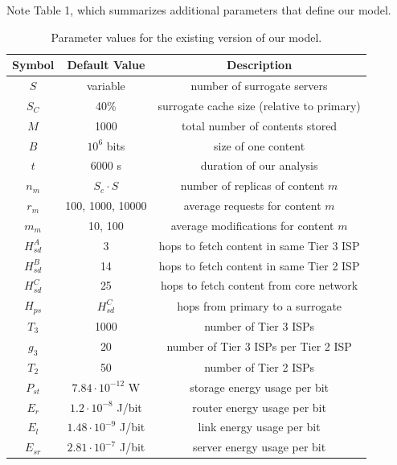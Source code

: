 \documentclass[
	a4paper, %
	10pt, %
	unnumberedsections, %
	twoside, %
]{LTJournalArticle}
\begin{document}
Note Table 1, which summarizes additional parameters that define our model.
\begin{table}[h]
\scriptsize
\begin{tabular}{ |c|c|c| } 
 \hline
 Symbol & Default Value & Description \\ 
 \hline
 $S$ & variable & number of surrogate servers \\ 
 \hline
 $S_C$ & 40\% & surrogate cache size (relative to primary) \\ 
 \hline
 $M$ & 1000 & total number of contents stored \\ 
 \hline
 $B$ & $10^6$ bits & size of one content \\ 
 \hline
 $t$ & 6000 s & duration of our analysis \\ 
 \hline
 $n_m$ & $S_c \cdot S$ & number of replicas of content $m$ \\ 
 \hline
 $r_m$ & 100, 1000, 10000 & average requests for content $m$ \\ 
 \hline
 $m_m$ & 10, 100 & average modifications for content $m$ \\ 
 \hline
 $H^A_{sd}$ & 3 & hops to fetch content in same Tier 3 ISP \\ 
 \hline
 $H^B_{sd}$ & 14 & hops to fetch content in same Tier 2 ISP \\ 
 \hline
 $H^C_{sd}$ & 25 & hops to fetch content from core network \\ 
 \hline
 $H_{ps}$ & $H^C_{sd}$ & hops from primary to a surrogate \\ 
 \hline
 $T_3$ & 1000 & number of Tier 3 ISPs \\ 
 \hline
 $g_3$ & 20 & number of Tier 3 ISPs per Tier 2 ISP \\ 
 \hline
 $T_2$ & 50 & number of Tier 2 ISPs \\ 
 \hline
 $P_{st}$ & $7.84 \cdot 10^{-12}$ W & storage energy usage per bit \\ 
 \hline
 $E_r$ & $1.2 \cdot 10^{-8}$ J/bit & router energy usage per bit \\ 
 \hline
 $E_l$ & $1.48 \cdot 10^{-9}$ J/bit & link energy usage per bit \\ 
 \hline
 $E_{sr}$ & $2.81 \cdot 10^{-7}$ J/bit & server energy usage per bit \\ 
 \hline
\end{tabular}
\caption{Parameter values for the existing version of our model.}
\end{table}
\normalsize
\end{document}
